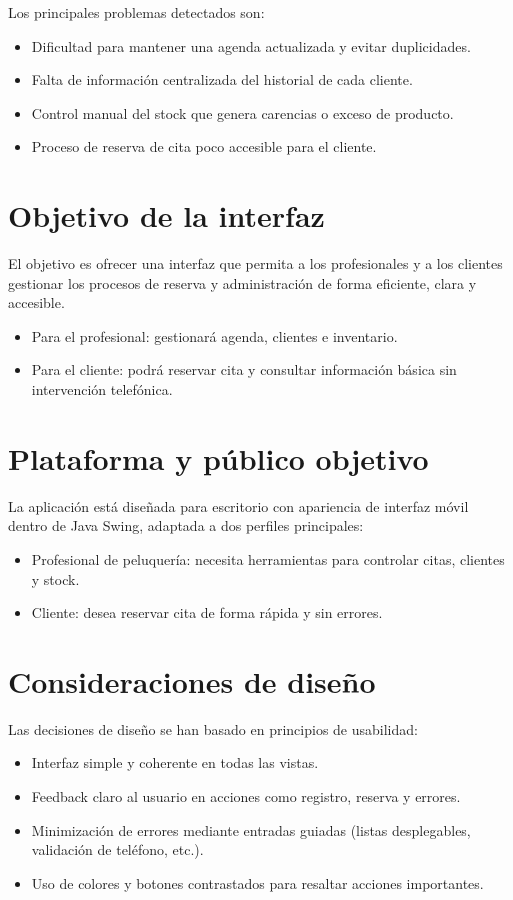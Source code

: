 \documentclass[12pt,a4paper]{report}
\begin{document}
Los principales problemas detectados son:
\begin{itemize}
    \item Dificultad para mantener una agenda actualizada y evitar duplicidades.
    \item Falta de información centralizada del historial de cada cliente.
    \item Control manual del stock que genera carencias o exceso de producto.
    \item Proceso de reserva de cita poco accesible para el cliente.
\end{itemize}

\section{Objetivo de la interfaz}
El objetivo es ofrecer una interfaz que permita a los profesionales y a los clientes gestionar los procesos de reserva y administración de forma eficiente, clara y accesible.
\begin{itemize}
    \item Para el profesional: gestionará agenda, clientes e inventario.
    \item Para el cliente: podrá reservar cita y consultar información básica sin intervención telefónica.
\end{itemize}

\section{Plataforma y público objetivo}
La aplicación está diseñada para escritorio con apariencia de interfaz móvil dentro de Java Swing, adaptada a dos perfiles principales:
\begin{itemize}
    \item Profesional de peluquería: necesita herramientas para controlar citas, clientes y stock.
    \item Cliente: desea reservar cita de forma rápida y sin errores.
\end{itemize}

\section{Consideraciones de diseño}
Las decisiones de diseño se han basado en principios de usabilidad:
\begin{itemize}
    \item Interfaz simple y coherente en todas las vistas.
    \item Feedback claro al usuario en acciones como registro, reserva y errores.
    \item Minimización de errores mediante entradas guiadas (listas desplegables, validación de teléfono, etc.).
    \item Uso de colores y botones contrastados para resaltar acciones importantes.
\end{itemize}
\end{document}
